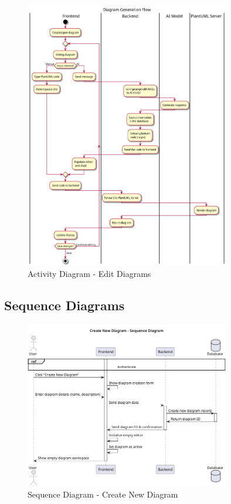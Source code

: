 \begin{figure}[H]
\centering
\includegraphics[width=0.8\textwidth]{conception/SprintIV/Activity_diagrams/edit_diagams.png}
\caption{Activity Diagram - Edit Diagrams}
\end{figure}

\subsection{Sequence Diagrams}

\begin{figure}[H]
\centering
\includegraphics[width=0.8\textwidth]{conception/SprintIV/sequence_diagrams/sequence_diagramManagement_4_1_CreateNewDiagram.png}
\caption{Sequence Diagram - Create New Diagram}
\end{figure}


